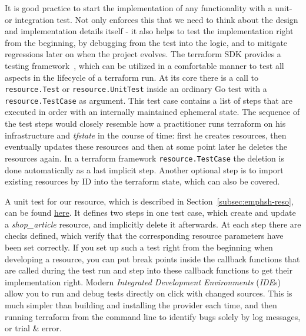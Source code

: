 \documentclass[paper=a4,11pt,numbers=noenddot]{article}
\begin{document}
It is good practice to start the implementation of any functionality with a unit- or integration test. Not only enforces this that we need to think about the design and implementation details itself - it also helps to test the implementation right from the beginning, by debugging from the test into the logic, and to mitigate regressions later on when the project evolves. The terraform SDK provides a testing framework~\cite{noauthor_terraform_acceptance_testing_nodate}, which can be utilized in a comfortable manner to test all aspects in the lifecycle of a terraform run. At its core there is a call to \verb'resource.Test' or \verb'resource.UnitTest' inside an ordinary Go test with a \verb'resource.TestCase' as argument. This test case contains a list of steps that are executed in order with an internally maintained ephemeral state. The sequence of the test steps would closely resemble how a practitioner runs terraform on his infrastructure and \emph{tfstate} in the course of time: first he creates resources, then eventually updates these resources and then at some point later he deletes the resources again. In a terraform framework \verb'resource.TestCase' the deletion is done automatically as a last implicit step. Another optional step is to import existing resources by ID into the terraform state, which can also be covered.

A unit test for our resource, which is described in Section~\ref{subsec:emphsh-reso}, can be found \href{https://github.com/ecky-l/terraform-provider-example/blob/main/src/tfp-example/example/shop_article_resource_test.go}{here}. It defines two steps in one test case, which create and update a \emph{shop\_article} resource, and implicitly delete it afterwards. At each step there are checks defined, which verify that the corresponding resource parameters have been set correctly. If you set up such a test right from the beginning when developing a resource, you can put break points inside the callback functions that are called during the test run and step into these callback functions to get their implementation right. Modern \emph{Integrated Development Environments} (\emph{IDE}s) allow you to run and debug tests directly on click with changed sources. This is much simpler than building and installing the provider each time, and then running terraform from the command line to identify bugs solely by log messages, or trial \& error.
\end{document}
